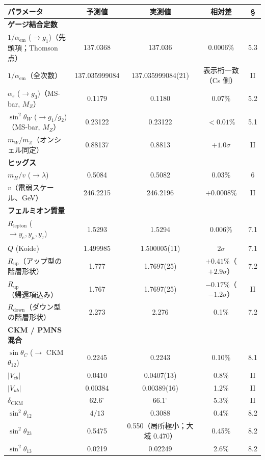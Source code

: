 \documentclass[fontsize=11pt,paper=a4,lualatex]{jlreq}
\begin{document}
\begin{center}\scriptsize\setlength{\tabcolsep}{3pt}
\begin{tabular}{@{}lcccc@{}}
\toprule
パラメータ & 予測値 & 実測値 & 相対差 & \S \\
\midrule
\textbf{ゲージ結合定数} & & & & \\
$1/\alpha_\mathrm{em}$ ($\to g_1$)（先頭項；Thomson 点） & 137.0368 & 137.036 & 0.0006\% & 5.3 \\
$1/\alpha_\mathrm{em}$（全次数） & 137.035999084 & 137.035999084(21) & 表示桁一致（Cs 側） & II \\
$\alpha_s$ ($\to g_3$)（MS-bar, $M_Z$） & 0.1179 & 0.1180 & 0.07\% & 5.2 \\
$\sin^2\!\theta_W$ ($\to g_1/g_2$)（MS-bar, $M_Z$） & 0.23122 & 0.23122 & $<0.01\%$ & 5.1 \\
$m_W/m_Z$（オンシェル同定） & 0.88137 & 0.8813 & $+1.0\sigma$ & II \\
\textbf{ヒッグス} & & & & \\
$m_H/v$ ($\to\lambda$) & 0.5084 & 0.5082 & 0.03\% & 6 \\
$v$（電弱スケール、GeV） & 246.2215 & 246.2196 & $+0.0008\%$ & II \\
\textbf{フェルミオン質量} & & & & \\
$R_\mathrm{lepton}$ ($\to y_e, y_\mu, y_\tau$) & 1.5293 & 1.5294 & 0.006\% & 7.1 \\
$Q$ (Koide) & 1.499985 & 1.500005(11) & $2\sigma$ & 7.1 \\
$R_\mathrm{up}$（アップ型の階層形状） & 1.777 & 1.7697(25) & $+0.41\%$（$+2.9\sigma$） & 7.2 \\
$R_\mathrm{up}$（帰還項込み） & 1.767 & 1.7697(25) & $-0.17\%$（$-1.2\sigma$） & II \\
$R_\mathrm{down}$（ダウン型の階層形状） & 2.273 & 2.276 & 0.1\% & 7.2 \\
\textbf{CKM / PMNS 混合} & & & & \\
$\sin\theta_C$ ($\to$ CKM $\theta_{12}$) & 0.2245 & 0.2243 & 0.10\% & 8.1 \\
$|V_{cb}|$ & 0.0410 & 0.0407(13) & 0.8\% & II \\
$|V_{ub}|$ & 0.00384 & 0.00389(16) & 1.2\% & II \\
$\delta_\mathrm{CKM}$ & $62.6^\circ$ & $66.1^\circ$ & 5.3\% & II \\
$\sin^2\!\theta_{12}$ & $4/13$ & 0.3088 & 0.4\% & 8.2 \\
$\sin^2\!\theta_{23}$ & 0.5475 & 0.550（局所極小；大域 0.470） & 0.45\% & 8.2 \\
$\sin^2\!\theta_{13}$ & 0.0219 & 0.02249 & 2.6\% & 8.2 \\
\bottomrule
\end{tabular}
\end{center}
\end{document}
